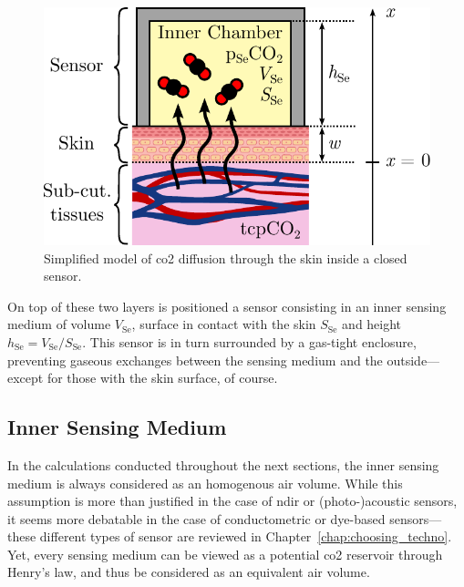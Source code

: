 \begin{figure}
	\centering
	\includegraphics[scale=0.7]{1_main_matter/tcco2_figures/diffusion_model.pdf}
	\caption{Simplified model of \gls{co2} diffusion through the skin inside a closed sensor.}
	\label{fig:tcco2:diffusion_model}
\end{figure}

On top of these two layers is positioned a sensor consisting in an inner sensing medium of volume $V_\text{Se}$, surface in contact with the skin $S_\text{Se}$ and height $h_\text{Se} = V_\text{Se} / S_\text{Se}$. This sensor is in turn surrounded by a gas-tight enclosure, preventing gaseous exchanges between the sensing medium and the outside---except for those with the skin surface, of course.

\subsection{Inner Sensing Medium}\label{sect:tcco2:inner_medium}

In the calculations conducted throughout the next sections, the inner sensing medium is always considered as an homogenous air volume. While this assumption is more than justified in the case of \gls{ndir} or (photo-)acoustic sensors, it seems more debatable in the case of conductometric or dye-based sensors---these different types of sensor are reviewed in Chapter~\ref{chap:choosing_techno}. Yet, every sensing medium can be viewed as a potential \gls{co2} reservoir through Henry's law, and thus be considered as an equivalent air volume.

